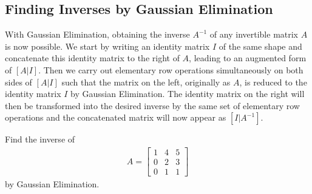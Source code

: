 \subsection{Finding Inverses by Gaussian Elimination}
\label{subsection:invGauss}
With Gaussian Elimination, obtaining the inverse $A^{-1}$ of any invertible matrix $A$ is now possible. We start by writing an identity matrix $I$ of the same shape and concatenate this identity matrix to the right of $A$, leading to an augmented form of $[A|I]$. Then we carry out elementary row operations simultaneously on both sides of $[A|I]$ such that the matrix on the left, originally as $A$, is reduced to the identity matrix $I$ by Gaussian Elimination. The identity matrix on the right will then be transformed into the desired inverse by the same set of elementary row operations and the concatenated matrix will now appear as $[I|A^{-1}]$. 
\begin{exmp}
Find the inverse of
\begin{align*}
A =
\begin{bmatrix}
1 & 4 & 5 \\
0 & 2 & 3 \\
0 & 1 & 1
\end{bmatrix}
\end{align*}
by Gaussian Elimination.
\end{exmp}
